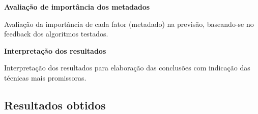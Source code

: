             \textbf{Avaliação de importância dos metadados}\par
            Avaliação da importância de cada fator (metadado) na previsão, baseando-se no feedback dos algoritmos testados.\newline

            \textbf{Interpretação dos resultados}\par
            Interpretação dos resultados para elaboração das conclusões com indicação das técnicas mais promissoras.\newline

        \subsection{Resultados obtidos}

